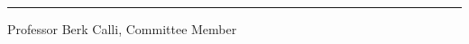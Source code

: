 \documentclass[12pt]{report}
\begin{document}
\vspace{0.25in}
\rule{3in}{0.8pt}

Professor Berk Calli,  Committee Member

\newpage

%
\doublespacing








%



\clearpage





\tableofcontents

\listoffigures

\listoftables
\end{document}
